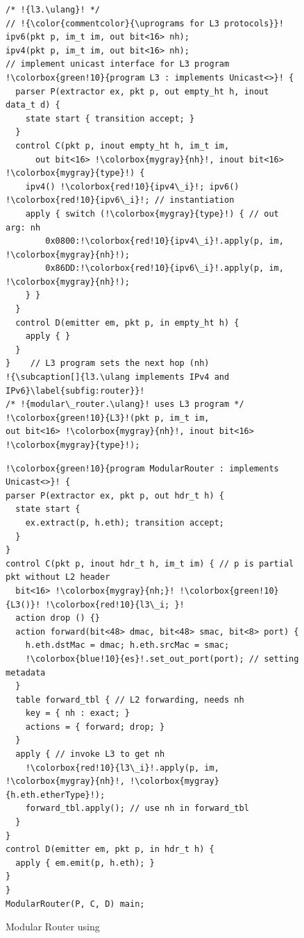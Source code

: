 \documentclass[letterpaper,twocolumn,10pt]{article}
\begin{document}
\begin{figure}[t]
\noindent \begin{minipage}[t]{.50\textwidth}
\begin{lstlisting}[frame=none, escapechar=!]
/* !{l3.\ulang}! */
// !{\color{commentcolor}{\uprograms for L3 protocols}}! 
ipv6(pkt p, im_t im, out bit<16> nh);
ipv4(pkt p, im_t im, out bit<16> nh);
// implement unicast interface for L3 program
!\colorbox{green!10}{program L3 : implements Unicast<>}! {
  parser P(extractor ex, pkt p, out empty_ht h, inout data_t d) {
    state start { transition accept; }
  }
  control C(pkt p, inout empty_ht h, im_t im,
      out bit<16> !\colorbox{mygray}{nh}!, inout bit<16> !\colorbox{mygray}{type}!) {
    ipv4() !\colorbox{red!10}{ipv4\_i}!; ipv6() !\colorbox{red!10}{ipv6\_i}!; // instantiation
    apply { switch (!\colorbox{mygray}{type}!) { // out arg: nh
        0x0800:!\colorbox{red!10}{ipv4\_i}!.apply(p, im, !\colorbox{mygray}{nh}!);
        0x86DD:!\colorbox{red!10}{ipv6\_i}!.apply(p, im, !\colorbox{mygray}{nh}!);
    } }
  }
  control D(emitter em, pkt p, in empty_ht h) {
    apply { }
  }
}    // L3 program sets the next hop (nh)
!{\subcaption[]{l3.\ulang implements IPv4 and IPv6}\label{subfig:router}}!
/* !{modular\_router.\ulang}! uses L3 program */
!\colorbox{green!10}{L3}!(pkt p, im_t im, 
out bit<16> !\colorbox{mygray}{nh}!, inout bit<16> !\colorbox{mygray}{type}!);
\end{lstlisting}
\end{minipage}\hspace{-4pt}\vline
\hfill\begin{minipage}[t]{.50\textwidth}
\begin{lstlisting}[frame=none, escapechar=!]
!\colorbox{green!10}{program ModularRouter : implements Unicast<>}! {
parser P(extractor ex, pkt p, out hdr_t h) {
  state start {
    ex.extract(p, h.eth); transition accept;
  }
}
control C(pkt p, inout hdr_t h, im_t im) { // p is partial pkt without L2 header
  bit<16> !\colorbox{mygray}{nh;}! !\colorbox{green!10}{L3()}! !\colorbox{red!10}{l3\_i; }!
  action drop () {}
  action forward(bit<48> dmac, bit<48> smac, bit<8> port) {
    h.eth.dstMac = dmac; h.eth.srcMac = smac;
    !\colorbox{blue!10}{es}!.set_out_port(port); // setting metadata
  }
  table forward_tbl { // L2 forwarding, needs nh
    key = { nh : exact; } 
    actions = { forward; drop; }
  }
  apply { // invoke L3 to get nh
    !\colorbox{red!10}{l3\_i}!.apply(p, im, !\colorbox{mygray}{nh}!, !\colorbox{mygray}{h.eth.etherType}!);
    forward_tbl.apply(); // use nh in forward_tbl
  }
}
control D(emitter em, pkt p, in hdr_t h) {
  apply { em.emit(p, h.eth); }
}
}
ModularRouter(P, C, D) main;
\end{lstlisting}
\label{subfig:router-main}
\end{minipage}
\caption[]{Modular Router using \uarch \footnotemark}
\label{fig:modular-router}
\end{figure}
\end{document}
